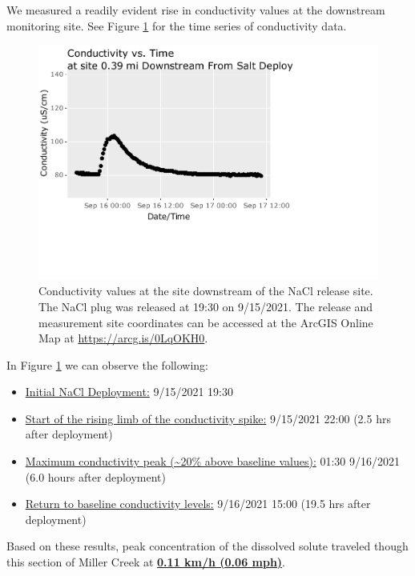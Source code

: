 \documentclass[
]{book}
\begin{document}
We measured a readily evident rise in conductivity values at the downstream monitoring site. See Figure \ref{fig:nacl-fig} for the time series of conductivity data.

\begin{figure}
\centering
\includegraphics{Miller_Creek_Vogel_Lake_Water_Quality_files/figure-latex/nacl-fig-1.pdf}
\caption{\label{fig:nacl-fig}Conductivity values at the site downstream of the NaCl release site. The NaCl plug was released at 19:30 on 9/15/2021. The release and measurement site coordinates can be accessed at the ArcGIS Online Map at \url{https://arcg.is/0LqOKH0}.}
\end{figure}

In Figure \ref{fig:nacl-fig} we can observe the following:

\begin{itemize}
\item
  \underline{Initial NaCl Deployment:} 9/15/2021 19:30
\item
  \underline{Start of the rising limb of the conductivity spike:} 9/15/2021 22:00 (2.5 hrs after deployment)
\item
  \underline{Maximum conductivity peak (\textasciitilde20\% above baseline values):} 01:30 9/16/2021 (6.0 hours after deployment)
\item
  \underline{Return to baseline conductivity levels:} 9/16/2021 15:00 (19.5 hrs after deployment)
\end{itemize}

Based on these results, peak concentration of the dissolved solute traveled though this section of Miller Creek at \underline{\textbf{0.11 km/h (0.06 mph)}}.
\end{document}
